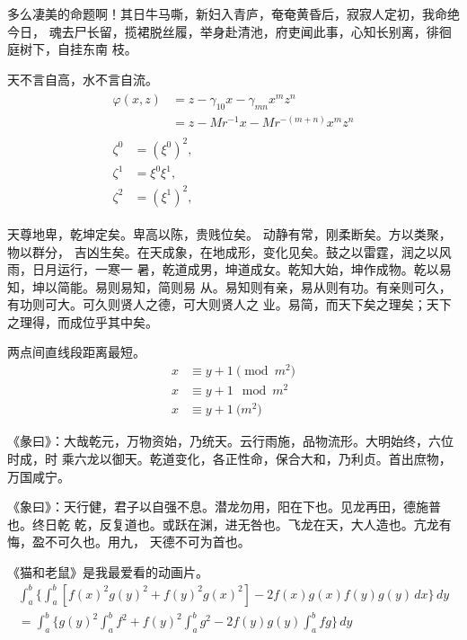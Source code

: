 多么凄美的命题啊！其日牛马嘶，新妇入青庐，奄奄黄昏后，寂寂人定初，我命绝今日，
魂去尸长留，揽裙脱丝履，举身赴清池，府吏闻此事，心知长别离，徘徊庭树下，自挂东南
枝。

\begin{remark}
天不言自高，水不言自流。
\begin{gather*}
\begin{split} 
\varphi(x,z)
&=z-\gamma_{10}x-\gamma_{mn}x^mz^n\\
&=z-Mr^{-1}x-Mr^{-(m+n)}x^mz^n
\end{split}\\[6pt]
\begin{align} \zeta^0&=(\xi^0)^2,\\
\zeta^1 &=\xi^0\xi^1,\\
\zeta^2 &=(\xi^1)^2,
\end{align}
\end{gather*}
\end{remark}

天尊地卑，乾坤定矣。卑高以陈，贵贱位矣。 动静有常，刚柔断矣。方以类聚，物以群分，
吉凶生矣。在天成象，在地成形，变化见矣。鼓之以雷霆，润之以风雨，日月运行，一寒一
暑，乾道成男，坤道成女。乾知大始，坤作成物。乾以易知，坤以简能。易则易知，简则易
从。易知则有亲，易从则有功。有亲则可久，有功则可大。可久则贤人之德，可大则贤人之
业。易简，而天下矣之理矣；天下之理得，而成位乎其中矣。

\begin{axiom}
两点间直线段距离最短。  
\begin{align}
x&\equiv y+1\pmod{m^2}\\
x&\equiv y+1\mod{m^2}\\
x&\equiv y+1\pod{m^2}
\end{align}
\end{axiom}

《彖曰》：大哉乾元，万物资始，乃统天。云行雨施，品物流形。大明始终，六位时成，时
乘六龙以御天。乾道变化，各正性命，保合大和，乃利贞。首出庶物，万国咸宁。

《象曰》：天行健，君子以自强不息。潜龙勿用，阳在下也。见龙再田，德施普也。终日乾
乾，反复道也。或跃在渊，进无咎也。飞龙在天，大人造也。亢龙有悔，盈不可久也。用九，
天德不可为首也。 　　

\begin{lemma}
《猫和老鼠》是我最爱看的动画片。
\begin{multline*}%
\int_a^b\biggl\{\int_a^b[f(x)^2g(y)^2+f(y)^2g(x)^2]
 -2f(x)g(x)f(y)g(y)\,dx\biggr\}\,dy \\
 =\int_a^b\biggl\{g(y)^2\int_a^bf^2+f(y)^2
  \int_a^b g^2-2f(y)g(y)\int_a^b fg\biggr\}\,dy
\end{multline*}
\end{lemma}

